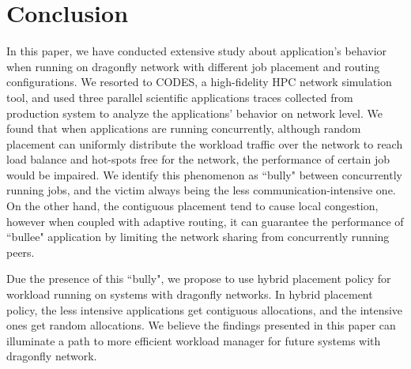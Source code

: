 \section{Conclusion}
\label{sec:conclusion}

In this paper, we have conducted extensive study about application's behavior when running on dragonfly network with different job placement and routing configurations. We resorted to CODES, a high-fidelity HPC network simulation tool, and used three parallel scientific applications traces collected from production system to analyze the applications' behavior on network level. We found that when applications are running concurrently, although random placement can uniformly distribute the workload traffic over the network to reach load balance and hot-spots free for the network, the performance of certain job would be impaired. We identify this phenomenon as ``bully" between concurrently running jobs, and the victim always being the less communication-intensive one. On the other hand, the contiguous placement tend to cause local congestion, however when coupled with adaptive routing, it can guarantee the performance of ``bullee" application by limiting the network sharing from concurrently running peers. 

Due the presence of this ``bully", we propose to use hybrid placement policy for workload running on systems with dragonfly networks. In hybrid placement policy, the less intensive applications get contiguous allocations, and the intensive ones get random allocations. We believe the findings presented in this paper can illuminate a path to more efficient workload manager for future systems with dragonfly network.


